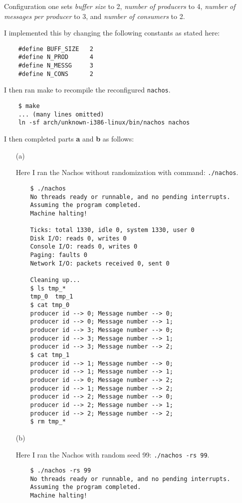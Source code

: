 \documentclass[11pt]{article}
\begin{document}
    \begin{question}
        Configuration one sets {\it buffer size} to 2, {\it number of producers} to 4,  {\it number of messages per producer} to 3, and {\it number of consumers} to 2.

    \begin{subquestion}
        I implemented this by changing the following constants as stated here:
        \begin{verbatim}
    #define BUFF_SIZE   2
    #define N_PROD      4
    #define N_MESSG     3
    #define N_CONS      2
        \end{verbatim}

        I then ran make to recompile the reconfigured {\tt nachos}.
        \begin{verbatim}
    $ make
    ... (many lines omitted)
    ln -sf arch/unknown-i386-linux/bin/nachos nachos
        \end{verbatim}

        I then completed parts {\bf a} and {\bf b} as follows:
        \begin{itemize}
            \item[(a)]{
                Here I ran the Nachos without randomization with command: {\tt ./nachos}.
                \begin{verbatim}
    $ ./nachos
    No threads ready or runnable, and no pending interrupts.
    Assuming the program completed.
    Machine halting!

    Ticks: total 1330, idle 0, system 1330, user 0
    Disk I/O: reads 0, writes 0
    Console I/O: reads 0, writes 0
    Paging: faults 0
    Network I/O: packets received 0, sent 0

    Cleaning up...
    $ ls tmp_*
    tmp_0  tmp_1
    $ cat tmp_0
    producer id --> 0; Message number --> 0;
    producer id --> 0; Message number --> 1;
    producer id --> 3; Message number --> 0;
    producer id --> 3; Message number --> 1;
    producer id --> 3; Message number --> 2;
    $ cat tmp_1
    producer id --> 1; Message number --> 0;
    producer id --> 1; Message number --> 1;
    producer id --> 0; Message number --> 2;
    producer id --> 1; Message number --> 2;
    producer id --> 2; Message number --> 0;
    producer id --> 2; Message number --> 1;
    producer id --> 2; Message number --> 2;
    $ rm tmp_*
                \end{verbatim}
            }
            \item[(b)]{
                Here I ran the Nachos with random seed 99: {\tt ./nachos -rs 99}.
                \begin{verbatim}
    $ ./nachos -rs 99
    No threads ready or runnable, and no pending interrupts.
    Assuming the program completed.
    Machine halting!


\end{verbatim}}
\end{itemize}
\end{subquestion}
\end{question}
\end{document}

